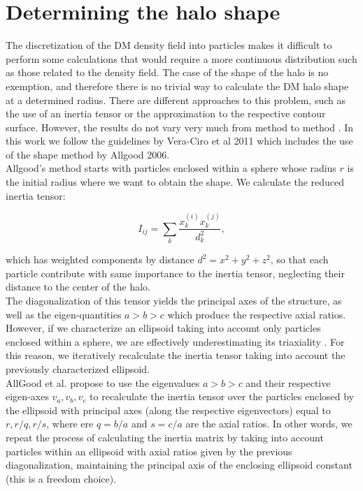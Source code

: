 \section{Determining the halo shape}
The discretization of the DM density field into particles makes it difficult  to perform some calculations that would require a more continuous distribution such as those related to the density field. The case of the shape of the halo is no exemption, and therefore there is no trivial way to calculate the DM halo shape at a determined radius. There are different approaches to this problem, such as the use of an inertia tensor or the approximation to the respective contour surface.
However, the results do not vary very much from method to method \cite{Vera-Ciro et al. 2011}. In this work we follow the guidelines by Vera-Ciro et al 2011 which includes the use of the shape method by Allgood 2006\cite{AllGood2006}.\\

Allgood's method starts with particles enclosed within a sphere whose radius $r$ is the initial radius where we want to obtain the shape. We calculate the reduced inertia tensor:

\begin{equation}
I_{ij} = \sum_k \frac{x_k^{(i)}x_k^{(j)}}{d^2_k},
\label{eq:inertia}
\end{equation}

which has weighted components by distance $d^2=x^2+y^2+z^2$, so that each particle contribute with same importance to the inertia tensor, neglecting their distance to the center of the halo.\\

The diagonalization of this tensor yields the principal axes of the structure, as well as the eigen-quantities $a>b>c$ which produce the respective axial ratios. However, if we characterize an ellipsoid taking into account only particles enclosed within a sphere, we are effectively underestimating its triaxiality \cite{AllGood}. For this reason, we iteratively recalculate the inertia tensor taking into account the previously characterized ellipsoid.\\

AllGood et al. propose to use the eigenvalues $a>b>c$ and their respective eigen-axes $v_a,v_b,v_c$ to recalculate the inertia tensor over the particles enclosed by the ellipsoid with principal axes (along the respective eigenvectors) equal to $r,r/q,r/s$, where ere $q = b/a$ and $s=c/a$ are the axial ratios. In other words, we repeat the process of calculating the inertia matrix by taking into account particles within an ellipsoid with axial ratios given by the previous diagonalization, maintaining the principal axis of the enclosing ellipsoid constant (this is a freedom choice).\\

